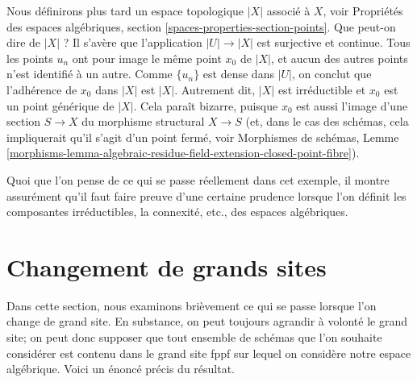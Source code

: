 \begin{example}
\medskip\noindent
Nous définirons plus tard un espace topologique $|X|$ associé à $X$, voir
Propriétés des espaces algébriques, section \ref{spaces-properties-section-points}.
Que peut-on dire de $|X|$ ?
Il s'avère que l'application $|U| \to |X|$ est surjective et continue.
Tous les points $u_n$ ont pour image le même point $x_0$ de $|X|$, et aucun
des autres points n'est identifié à un autre. Comme $\{u_n\}$ est dense dans $|U|$, on
conclut que l'adhérence de $x_0$ dans $|X|$ est $|X|$. Autrement dit,
$|X|$ est irréductible et $x_0$ est un point générique de $|X|$. Cela paraît
bizarre, puisque $x_0$ est aussi l'image d'une section
$S \to X$ du morphisme structural $X \to S$ (et, dans le cas des
schémas, cela impliquerait qu'il s'agit d'un point fermé, voir
Morphismes de schémas, Lemme
\ref{morphisms-lemma-algebraic-residue-field-extension-closed-point-fibre}).
\end{example}

\noindent
Quoi que l'on pense de ce qui se passe réellement dans cet exemple, il montre assurément
qu'il faut faire preuve d'une certaine prudence lorsque l'on définit les composantes
irréductibles, la connexité, etc., des espaces algébriques.






\section{Changement de grands sites}
\label{section-change-big-site}

\noindent
Dans cette section, nous examinons brièvement ce qui se passe lorsque l'on
change de grand site. En substance, on peut toujours agrandir à volonté le grand
site; on peut donc supposer que tout ensemble de schémas que l'on souhaite
considérer est contenu dans le grand site fppf sur lequel on considère notre
espace algébrique. Voici un énoncé précis du résultat.

